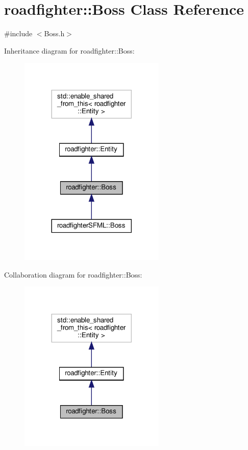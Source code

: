 \hypertarget{classroadfighter_1_1Boss}{}\section{roadfighter\+:\+:Boss Class Reference}
\label{classroadfighter_1_1Boss}


{\ttfamily \#include $<$Boss.\+h$>$}



Inheritance diagram for roadfighter\+:\+:Boss\+:\nopagebreak
\begin{figure}[H]
\begin{center}
\leavevmode
\includegraphics[width=197pt]{classroadfighter_1_1Boss__inherit__graph}
\end{center}
\end{figure}


Collaboration diagram for roadfighter\+:\+:Boss\+:\nopagebreak
\begin{figure}[H]
\begin{center}
\leavevmode
\includegraphics[width=197pt]{classroadfighter_1_1Boss__coll__graph}
\end{center}
\end{figure}
